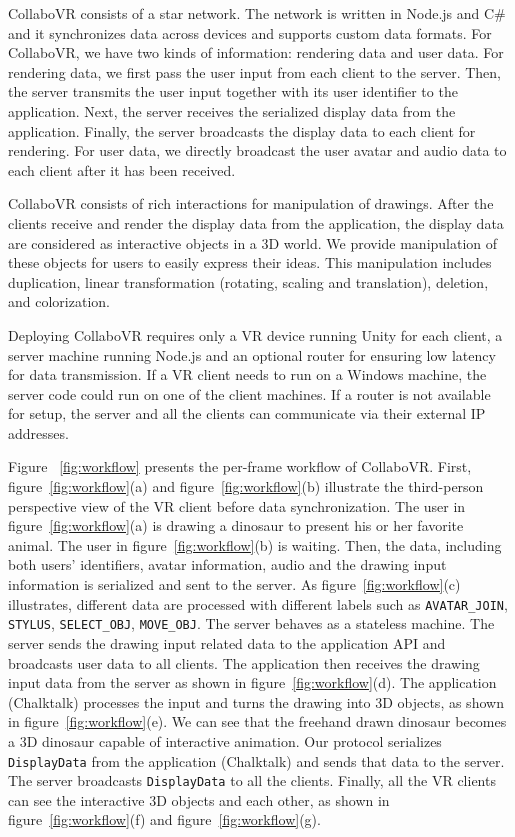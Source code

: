 \documentclass{sigchi}
\begin{document}
CollaboVR consists of a star network. The network is written in Node.js and C\# and it synchronizes data across devices and supports custom data formats. For CollaboVR, we have two kinds of information: rendering data and user data. For rendering data, we first pass the user input from each client to the server. Then, the server transmits the user input together with its user identifier to the application. Next, the server receives the serialized display data from the application. Finally, the server broadcasts the display data to each client for rendering. For user data, we directly broadcast the user avatar and audio data to each client after it has been received.

CollaboVR consists of rich interactions for manipulation of drawings. After the clients receive and render the display data from the application, the display data are considered as interactive objects in a 3D world. We provide manipulation of these objects for users to easily express their ideas. This manipulation includes duplication, linear transformation (rotating, scaling and translation), deletion, and colorization.

Deploying CollaboVR requires only a VR device running Unity for each client, a server machine running Node.js and an optional router for ensuring low latency for data transmission. If a VR client needs to run on a Windows machine, the server code could run on one of the client machines. If a router is not available for setup, the server and all the clients can communicate via their external IP addresses.


Figure ~\ref{fig:workflow} presents the per-frame workflow of CollaboVR. First, figure~\ref{fig:workflow}(a) and figure~\ref{fig:workflow}(b) illustrate the third-person perspective view of the VR client before data synchronization. The user in figure~\ref{fig:workflow}(a) is drawing a dinosaur to present his or her favorite animal. The user in figure~\ref{fig:workflow}(b) is waiting. Then, the data, including both users' identifiers, avatar information, audio and the drawing input information is serialized and sent to the server. As figure~\ref{fig:workflow}(c) illustrates, different data are processed with different labels such as \verb|AVATAR_JOIN|, \verb|STYLUS|, \verb|SELECT_OBJ|, \verb|MOVE_OBJ|. The server behaves as a stateless machine. The server sends the drawing input related data to the application API and broadcasts user data to all clients. The application then receives the drawing input data from the server as shown in figure~\ref{fig:workflow}(d). The application (Chalktalk) processes the input and turns the drawing into 3D objects, as shown in figure~\ref{fig:workflow}(e). We can see that the freehand drawn dinosaur becomes a 3D dinosaur capable of interactive animation. Our protocol serializes \verb|DisplayData| from the application (Chalktalk) and sends that data to the server. The server broadcasts \verb|DisplayData| to all the clients. Finally, all the VR clients can see the interactive 3D objects and each other, as shown in figure~\ref{fig:workflow}(f) and figure~\ref{fig:workflow}(g).
\end{document}
